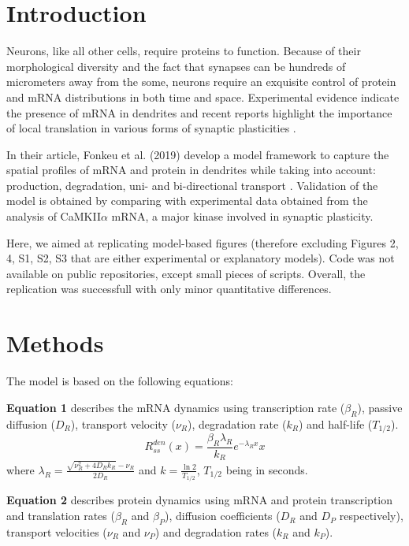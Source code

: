 
\section{Introduction}

Neurons, like all other cells, require proteins to function. Because of their morphological diversity and the fact that synapses can be hundreds of micrometers away from the some, neurons require an exquisite control of protein and mRNA distributions in both time and space.
Experimental evidence indicate the presence of mRNA in dendrites and recent reports highlight the importance of local translation in various forms of synaptic plasticities \supercite{Hafner2019, Younts2016}.  

In their article, Fonkeu et al. (2019) develop a model framework to capture the spatial profiles of mRNA and protein in dendrites while taking into account: production, degradation, uni- and bi-directional transport \supercite{Fonkeu2019}. Validation of the model is obtained  by comparing with experimental data obtained from the analysis of CaMKII$\alpha$ mRNA, a major kinase involved in synaptic plasticity. 

Here, we aimed at replicating model-based figures (therefore excluding Figures 2, 4, S1, S2, S3 that are either experimental or explanatory models). Code was not available on public repositories, except small pieces of scripts. Overall, the replication was successfull with only minor quantitative differences. 

\section{Methods}

The model is based on the following equations:

\textbf{Equation 1} describes the mRNA dynamics using transcription rate ($\beta_{R}$), passive diffusion ($D_{R}$), transport velocity ($\nu_{R}$), degradation rate ($k_{R}$) and half-life ($T_{1/2}$).
\begin{equation}
  R^{den}_{ss}(x) = \frac{\beta_{R}\lambda_{R}}{k_{R}} e^{-\lambda_{R}x}x
\end{equation}
where $\lambda_{R} = \frac{\sqrt{\nu^{2}_{R} + 4D_{R}k_{R}}-\nu_{R}}{2D_{R}}$ and $k = \frac{\ln{2}}{T_{1/2}}$, $T_{1/2}$ being in seconds.


\textbf{Equation 2} describes protein dynamics using mRNA and protein transcription and translation rates ($\beta_{R}$ and $\beta_{P}$), diffusion coefficients ($D_{R}$ and $D_{P}$ respectively), transport velocities ($\nu_{R}$ and $\nu_{P}$) and degradation rates ($k_{R}$ and $k_{P}$).

